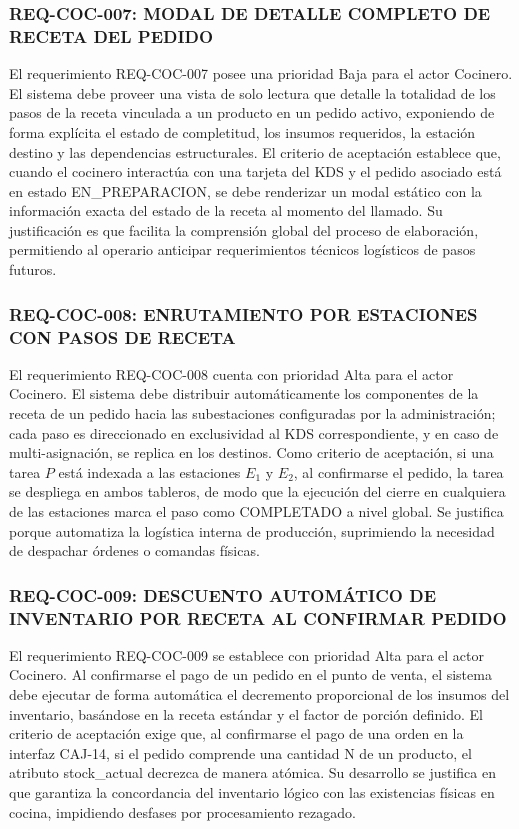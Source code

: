 \subsubsection{REQ-COC-007: MODAL DE DETALLE COMPLETO DE RECETA DEL PEDIDO}
El requerimiento REQ-COC-007 posee una prioridad Baja para el actor Cocinero. El sistema debe proveer una vista de solo lectura que detalle la totalidad de los pasos de la receta vinculada a un producto en un pedido activo, exponiendo de forma explícita el estado de completitud, los insumos requeridos, la estación destino y las dependencias estructurales. El criterio de aceptación establece que, cuando el cocinero interactúa con una tarjeta del KDS y el pedido asociado está en estado EN\_PREPARACION, se debe renderizar un modal estático con la información exacta del estado de la receta al momento del llamado. Su justificación es que facilita la comprensión global del proceso de elaboración, permitiendo al operario anticipar requerimientos técnicos logísticos de pasos futuros.

\subsubsection{REQ-COC-008: ENRUTAMIENTO POR ESTACIONES CON PASOS DE RECETA}
El requerimiento REQ-COC-008 cuenta con prioridad Alta para el actor Cocinero. El sistema debe distribuir automáticamente los componentes de la receta de un pedido hacia las subestaciones configuradas por la administración; cada paso es direccionado en exclusividad al KDS correspondiente, y en caso de multi-asignación, se replica en los destinos. Como criterio de aceptación, si una tarea $P$ está indexada a las estaciones $E_1$ y $E_2$, al confirmarse el pedido, la tarea se despliega en ambos tableros, de modo que la ejecución del cierre en cualquiera de las estaciones marca el paso como COMPLETADO a nivel global. Se justifica porque automatiza la logística interna de producción, suprimiendo la necesidad de despachar órdenes o comandas físicas.  

\subsubsection{REQ-COC-009: DESCUENTO AUTOMÁTICO DE INVENTARIO POR RECETA AL CONFIRMAR PEDIDO}
El requerimiento REQ-COC-009 se establece con prioridad Alta para el actor Cocinero. Al confirmarse el pago de un pedido en el punto de venta, el sistema debe ejecutar de forma automática el decremento proporcional de los insumos del inventario, basándose en la receta estándar y el factor de porción definido. El criterio de aceptación exige que, al confirmarse el pago de una orden en la interfaz CAJ-14, si el pedido comprende una cantidad N de un producto, el atributo stock\_actual decrezca de manera atómica. Su desarrollo se justifica en que garantiza la concordancia del inventario lógico con las existencias físicas en cocina, impidiendo desfases por procesamiento rezagado.

